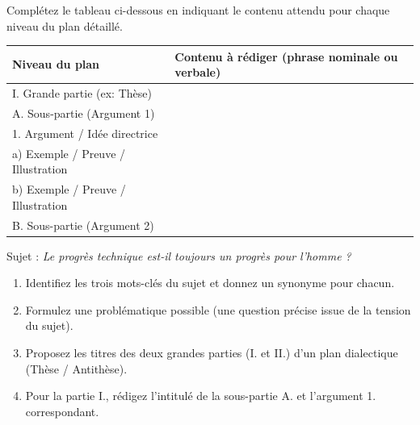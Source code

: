 \documentclass[11pt]{article}
\begin{document}
\begin{exercice}
Complétez le tableau ci-dessous en indiquant le contenu attendu pour chaque niveau du plan détaillé.

\begin{tabular}{|p{3.5cm}|p{11cm}|}
\hline
\textbf{Niveau du plan} & \textbf{Contenu à rédiger (phrase nominale ou verbale)} \\
\hline
I. Grande partie (ex: Thèse) &  \\
\hline
A. Sous-partie (Argument 1) &  \\
\hline
1. Argument / Idée directrice &  \\
\hline
a) Exemple / Preuve / Illustration &  \\
\hline
b) Exemple / Preuve / Illustration &  \\
\hline
B. Sous-partie (Argument 2) &  \\
\hline
\end{tabular}
\end{exercice}

\begin{exercice}
Sujet : \og \textit{Le progrès technique est-il toujours un progrès pour l'homme ?} \fg{}

\begin{enumerate}
    \item Identifiez les trois mots-clés du sujet et donnez un synonyme pour chacun.
    \item Formulez une problématique possible (une question précise issue de la tension du sujet).
    \item Proposez les titres des deux grandes parties (I. et II.) d'un plan dialectique (Thèse / Antithèse).
    \item Pour la partie I., rédigez l'intitulé de la sous-partie A. et l'argument 1. correspondant.
\end{enumerate}
\end{exercice}
\end{document}
